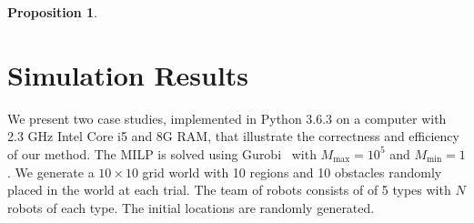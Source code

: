 \documentclass[Afour,sageh,times]{sagej}
\newtheorem{prop}[thm]{Proposition}
\newcommand{\RNum}[1]{\uppercase\expandafter{\romannumeral #1\relax}}
\begin{document}
{{{\begin{prop}

\end{prop}

\section{Simulation Results}\label{sec:sim}
We present two case studies, implemented in Python 3.6.3 on a computer with 2.3 GHz Intel Core i5 and 8G RAM, that illustrate the correctness and efficiency of our method. The MILP is solved using Gurobi~\cite{gurobi} with $M_{\text{max}}=10^5$ and $M_{\text{min}}=1$. We generate a  $10\times 10$ grid world with 10 regions and 10 obstacles randomly placed in the world at each trial. The team of robots consists of of 5 types with $N$ robots of each type. The initial locations are randomly generated.


}}}
\end{document}
